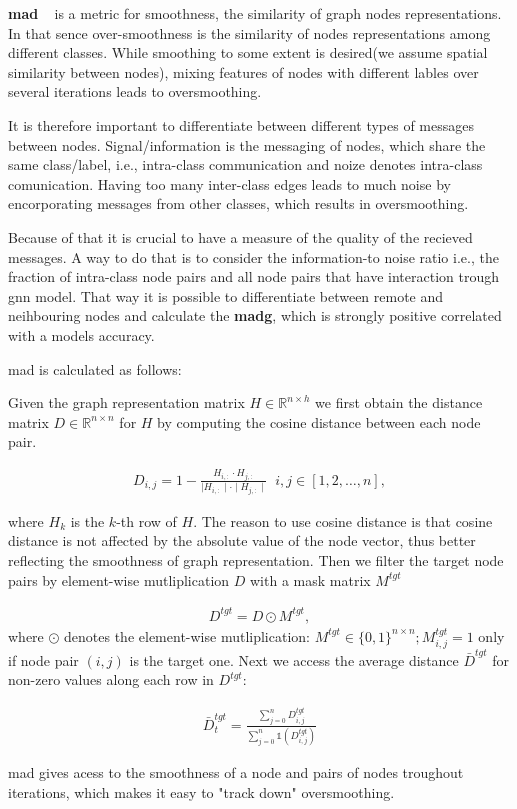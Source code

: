 \textbf{\Ac{mad}} ~\cite{Chen2020} is a metric for smoothness, the similarity of graph nodes representations. In that sence over-smoothness is the similarity of nodes representations among different classes.
While smoothing to some extent is desired(we assume spatial similarity between nodes), mixing features of nodes with different lables over several iterations leads to oversmoothing.

It is therefore important to differentiate between different types of messages between nodes. Signal/information is the messaging of nodes, which share the same class/label, i.e., intra-class communication and noize denotes intra-class comunication. Having too many inter-class edges leads to much noise by encorporating messages from other classes, which results in oversmoothing.

Because of that it is crucial to have a measure of the quality of the recieved messages. A way to do that is to consider the information-to noise ratio i.e., the fraction of intra-class node pairs and all node pairs that have interaction trough \ac{gnn} model. That way it is possible to differentiate between remote and neihbouring nodes and calculate the \textbf{\ac{madg}}, which is strongly positive correlated with a models accuracy.

\ac{mad} is calculated as follows:

Given the graph representation matrix $H \in \mathbb{R}^{n \times h}$ we
first obtain the distance matrix $D \in \mathbb{R}^{n \times n}$ for $H$ by
computing the cosine distance between each node pair.

\begin{align*}
    D_{i,j} = 1 - \frac{H_{i,:} \cdot H_{j,:}}{\mid H_{i,:}\mid  \cdot \mid H_{j,:}\mid} \; \;  i,j \in [1,2, \dots, n],
\end{align*}

where $H_{k}$ is the $k$-th row of $H$. The reason to use cosine distance is that cosine distance is not affected by the absolute value of the node vector,
thus better reflecting the smoothness of graph representation. Then we filter the target node pairs by element-wise mutliplication $D$ with a mask matrix $M^{tgt}$

\begin{align*}
    D^{tgt} = D \odot M^{tgt},
\end{align*}
where $\odot$ denotes the element-wise mutliplication: $M^{tgt} \in \{0,1\}^{n \times n}; M_{i,j}^{tgt}= 1$ only if node pair $(i,j)$ is the target one.
Next we access the average distance $\bar{D}^{tgt}$ for non-zero values along each row in $D^{tgt}:$

\begin{align*}
    \bar{D}_{t}^{tgt} = \frac{\sum_{j=0}^{n}D_{i,j}^{tgt}}{\sum_{j=0}^{n}\mathds{1}(D_{i,j}^{tgt})}
\end{align*}


\Ac{mad} gives acess to the smoothness of a node and pairs of nodes troughout iterations, which makes it easy to "track down" oversmoothing.

